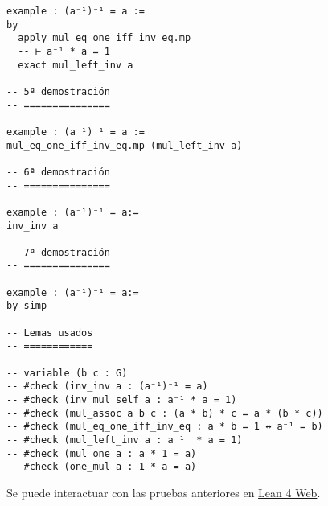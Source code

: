 \begin{verbatim}
example : (a⁻¹)⁻¹ = a :=
by
  apply mul_eq_one_iff_inv_eq.mp
  -- ⊢ a⁻¹ * a = 1
  exact mul_left_inv a

-- 5ª demostración
-- ===============

example : (a⁻¹)⁻¹ = a :=
mul_eq_one_iff_inv_eq.mp (mul_left_inv a)

-- 6ª demostración
-- ===============

example : (a⁻¹)⁻¹ = a:=
inv_inv a

-- 7ª demostración
-- ===============

example : (a⁻¹)⁻¹ = a:=
by simp

-- Lemas usados
-- ============

-- variable (b c : G)
-- #check (inv_inv a : (a⁻¹)⁻¹ = a)
-- #check (inv_mul_self a : a⁻¹ * a = 1)
-- #check (mul_assoc a b c : (a * b) * c = a * (b * c))
-- #check (mul_eq_one_iff_inv_eq : a * b = 1 ↔ a⁻¹ = b)
-- #check (mul_left_inv a : a⁻¹  * a = 1)
-- #check (mul_one a : a * 1 = a)
-- #check (one_mul a : 1 * a = a)
\end{verbatim}
Se puede interactuar con las pruebas anteriores en \href{https://lean.math.hhu.de/\#url=https://raw.githubusercontent.com/jaalonso/Calculemus2/main/src/Inverso\_del\_inverso\_en\_grupos.lean}{Lean 4 Web}.


